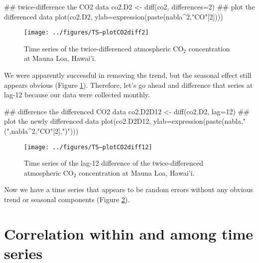 \begin{Schunk}
\begin{Sinput}
 ## twice-difference the CO2 data
 co2.D2 <- diff(co2, differences=2)
 ## plot the differenced data
 plot(co2.D2, ylab=expression(paste(nabla^2,"CO"[2])))
\end{Sinput}
\end{Schunk}

  
\begin{figure}[htp]
\begin{center}
\texttt{[image: ../figures/TS--plotCO2diff2]}
\end{center}
\caption{Time series of the twice-differenced atmospheric CO$_2$ concentration at Mauna Loa, Hawai'i.}
\label{fig:LW1.figCO2diff2}
\end{figure}

We were apparently successful in removing the trend, but the seasonal effect still appears obvious (Figure \ref{fig:LW1.figCO2diff2}).  Therefore, let's go ahead and difference that series at lag-12 because our data were collected monthly.

\begin{Schunk}
\begin{Sinput}
 ## difference the differenced CO2 data
 co2.D2D12 <- diff(co2.D2, lag=12)
 ## plot the newly differenced data
 plot(co2.D2D12,
      ylab=expression(paste(nabla,"(",nabla^2,"CO"[2],")")))
\end{Sinput}
\end{Schunk}

  
\begin{figure}[htp]
\begin{center}
\texttt{[image: ../figures/TS--plotCO2diff12]}
\end{center}
\caption{Time series of the lag-12 difference of the twice-differenced atmospheric CO$_2$ concentration at Mauna Loa, Hawai'i.}
\label{fig:LW1.figCO2diff12}
\end{figure}

\noindent Now we have a time series that appears to be random errors without any obvious trend or seasonal components (Figure \ref{fig:LW1.figCO2diff12}).

\section{Correlation within and among time series}
  
